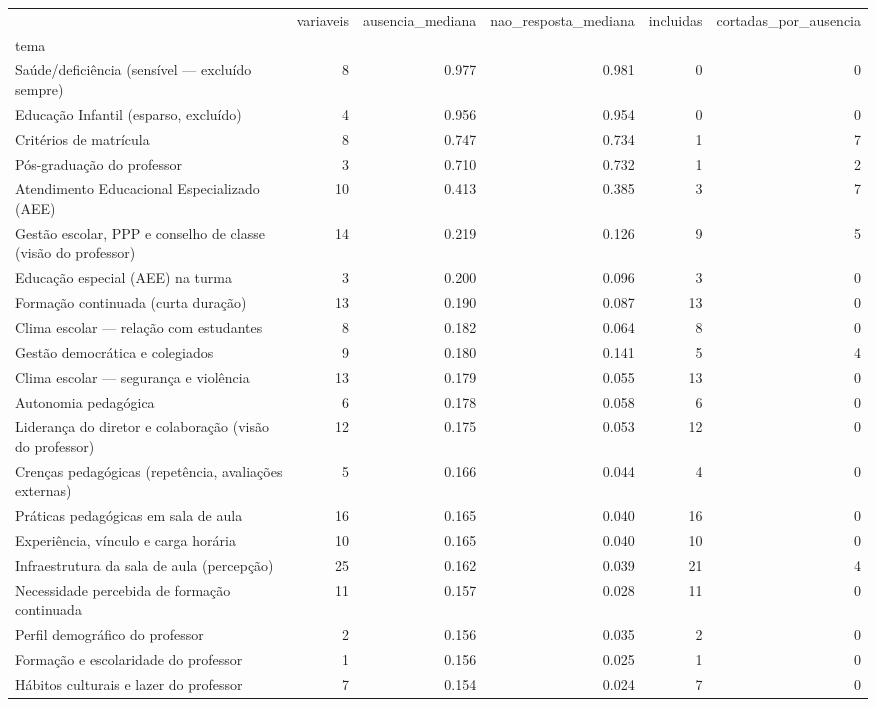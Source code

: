 \begin{tabular}{lrrrrr}
\toprule
 & variaveis & ausencia\_mediana & nao\_resposta\_mediana & incluidas & cortadas\_por\_ausencia \\
tema &  &  &  &  &  \\
\midrule
Saúde/deficiência (sensível — excluído sempre) & 8 & 0.977 & 0.981 & 0 & 0 \\
Educação Infantil (esparso, excluído) & 4 & 0.956 & 0.954 & 0 & 0 \\
Critérios de matrícula & 8 & 0.747 & 0.734 & 1 & 7 \\
Pós-graduação do professor & 3 & 0.710 & 0.732 & 1 & 2 \\
Atendimento Educacional Especializado (AEE) & 10 & 0.413 & 0.385 & 3 & 7 \\
Gestão escolar, PPP e conselho de classe (visão do professor) & 14 & 0.219 & 0.126 & 9 & 5 \\
Educação especial (AEE) na turma & 3 & 0.200 & 0.096 & 3 & 0 \\
Formação continuada (curta duração) & 13 & 0.190 & 0.087 & 13 & 0 \\
Clima escolar — relação com estudantes & 8 & 0.182 & 0.064 & 8 & 0 \\
Gestão democrática e colegiados & 9 & 0.180 & 0.141 & 5 & 4 \\
Clima escolar — segurança e violência & 13 & 0.179 & 0.055 & 13 & 0 \\
Autonomia pedagógica & 6 & 0.178 & 0.058 & 6 & 0 \\
Liderança do diretor e colaboração (visão do professor) & 12 & 0.175 & 0.053 & 12 & 0 \\
Crenças pedagógicas (repetência, avaliações externas) & 5 & 0.166 & 0.044 & 4 & 0 \\
Práticas pedagógicas em sala de aula & 16 & 0.165 & 0.040 & 16 & 0 \\
Experiência, vínculo e carga horária & 10 & 0.165 & 0.040 & 10 & 0 \\
Infraestrutura da sala de aula (percepção) & 25 & 0.162 & 0.039 & 21 & 4 \\
Necessidade percebida de formação continuada & 11 & 0.157 & 0.028 & 11 & 0 \\
Perfil demográfico do professor & 2 & 0.156 & 0.035 & 2 & 0 \\
Formação e escolaridade do professor & 1 & 0.156 & 0.025 & 1 & 0 \\
Hábitos culturais e lazer do professor & 7 & 0.154 & 0.024 & 7 & 0 \\

\end{tabular}
